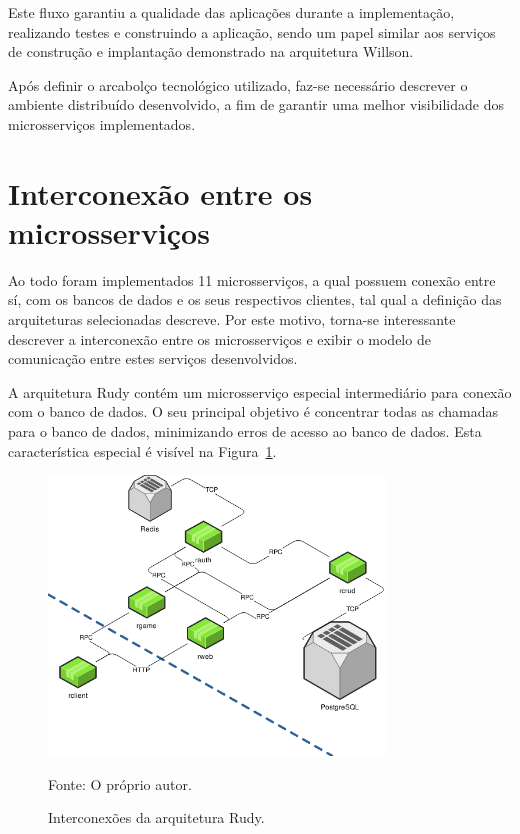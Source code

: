 Este fluxo garantiu a qualidade das aplicações durante a implementação, realizando testes e construindo a aplicação, sendo um papel similar aos serviços de construção e implantação demonstrado na arquitetura Willson.

Após definir o arcabolço tecnológico utilizado, faz-se necessário descrever o ambiente distribuído desenvolvido, a fim de garantir uma melhor visibilidade dos microsserviços implementados.

\section{Interconexão entre os microsserviços}
\label{sec:interconexao}

Ao todo foram implementados 11 microsserviços, a qual possuem conexão entre sí, com os bancos de dados e os seus respectivos clientes, tal qual a definição das arquiteturas selecionadas descreve.
%
Por este motivo, torna-se interessante descrever a interconexão entre os microsserviços e exibir o modelo de comunicação entre estes serviços desenvolvidos.

A arquitetura Rudy contém um microsserviço especial intermediário para conexão com o banco de dados.
%
O seu principal objetivo é concentrar todas as chamadas para o banco de dados, minimizando erros de acesso ao banco de dados.
%
Esta característica especial é visível na Figura~\ref{fig:interconexao_rudy}.

\begin{figure}[htb!]
  \caption{Interconexões da arquitetura Rudy.}
  \label{fig:interconexao_rudy}
  \includegraphics[width=0.8\textwidth]{figuras/interconexoes/rudy.png}
  \centering

  Fonte: O próprio autor.
\end{figure}

